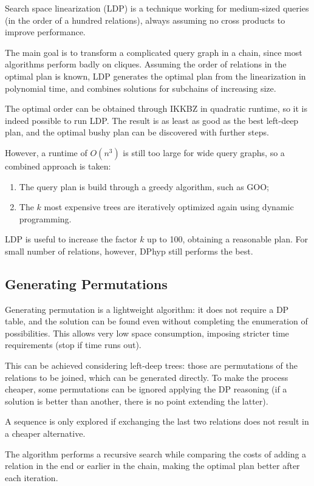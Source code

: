 Search space linearization (LDP) is a technique working for medium-sized queries (in the order of a hundred relations), always assuming no cross products to improve performance. 

The main goal is to transform a complicated query graph in a chain, since most algorithms perform badly on cliques. Assuming the order of relations in the optimal plan is known, LDP generates the optimal plan from the linearization in polynomial time, and combines solutions for subchains of increasing size.

The optimal order can be obtained through IKKBZ in quadratic runtime, so it is indeed possible to run LDP. The result is as least as good as the best left-deep plan, and the optimal bushy plan can be discovered with further steps.

However, a runtime of $O(n^3)$ is still too large for wide query graphs, so a combined approach is taken:
\begin{enumerate}
	\item The query plan is build through a greedy algorithm, such as GOO;
	\item The $k$ most expensive trees are iteratively optimized again using dynamic programming.
\end{enumerate}

LDP is useful to increase the factor $k$ up to 100, obtaining a reasonable plan. For small number of relations, however, DPhyp still performs the best. 

\subsection{Generating Permutations}
Generating permutation is a lightweight algorithm: it does not require a DP table, and the solution can be found even without completing the enumeration of possibilities. This allows very low space consumption, imposing stricter time requirements (stop if time runs out).

This can be achieved considering left-deep trees: those are permutations of the relations to be joined, which can be generated directly. To make the process cheaper, some permutations can be ignored applying the DP reasoning (if a solution is better than another, there is no point extending the latter).

A sequence is only explored if exchanging the last two relations does not result in a cheaper alternative. 

The algorithm performs a recursive search while comparing the costs of adding a relation in the end or earlier in the chain, making the optimal plan better after each iteration. 

